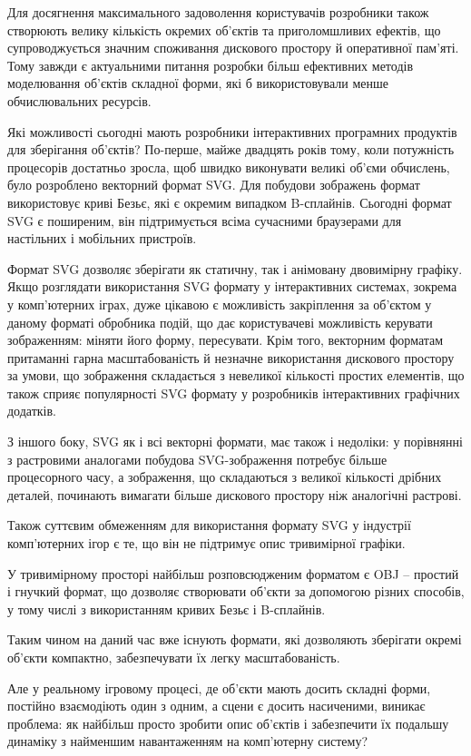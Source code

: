 \let\mypdfximage\pdfximage\def\pdfximage{\immediate\mypdfximage}\documentclass[14pt,a4paper]{extarticle}
\theoremstyle{definition}
\renewcommand{\[}{\begin{singlespace}\begin{equation*}}
\renewcommand{\]}{\end{equation*}\end{singlespace}}
\renewcommand{\+}{\discretionary{\mbox{\scriptsize$\hookleftarrow$}}{}{}}
\begin{document}
Для досягнення максимального задоволення користувачів розробники також створюють велику кількість окремих об'єктів та приголомшливих ефектів, що супроводжується значним споживання дискового простору й оперативної пам'яті. Тому завжди є актуальними питання розробки більш ефективних методів моделювання об'єктів складної форми, які б використовували менше обчислювальних ресурсів.

Які можливості сьогодні мають розробники інтерактивних програмних продуктів для зберігання об'єктів? По-перше, майже двадцять років тому, коли потужність процесорів достатньо зросла, щоб швидко виконувати великі об'єми обчислень, було розроблено векторний формат SVG. Для побудови зображень формат використовує криві Безьє, які є окремим випадком B-сплайнів. Сьогодні формат SVG є поширеним, він підтримується всіма сучасними браузерами для настільних і мобільних пристроїв.

Формат SVG дозволяє зберігати як статичну, так і анімовану двовимірну графіку. Якщо розглядати використання SVG формату у інтерактивних системах, зокрема у комп'ютерних іграх, дуже цікавою є можливість закріплення за об'єктом у даному форматі обробника подій, що дає користувачеві можливість керувати зображенням: міняти його форму, пересувати.
Крім того, векторним форматам притаманні гарна масштабованість й незначне використання дискового простору за умови, що зображення складається з невеликої кількості простих елементів, що також сприяє популярності SVG формату у розробників інтерактивних графічних додатків. 

З іншого боку, SVG як і всі векторні формати, має також і недоліки: у порівнянні з растровими аналогами побудова SVG-зображення потребує більше процесорного часу, а зображення, що складаються з великої кількості дрібних деталей, починають вимагати більше дискового простору ніж аналогічні растрові. 

Також суттєвим обмеженням для використання формату SVG у індустрії комп'ютерних ігор є те, що він не підтримує опис тривимірної графіки.

У тривимірному просторі найбільш розповсюдженим форматом є OBJ – простий і гнучкий формат, що дозволяє створювати об'єкти за допомогою різних способів, у тому числі з використанням кривих Безьє і B-сплайнів.
 
Таким чином на даний час вже існують формати, які дозволяють зберігати окремі об'єкти компактно, забезпечувати їх легку масштабованість.

Але у реальному ігровому процесі, де об'єкти мають досить складні форми,  постійно взаємодіють один з одним, а сцени є досить насиченими, виникає проблема: як найбільш просто зробити опис об'єктів і забезпечити їх подальшу динаміку з найменшим навантаженням на комп'ютерну систему?
\end{document}
